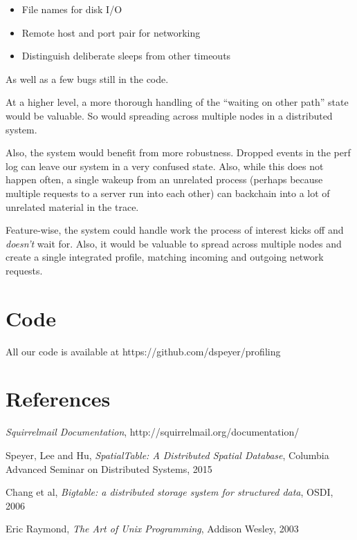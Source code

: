 \documentclass[10pt]{article}
\begin{document}
\begin{itemize}
\item File names for disk I/O
\item Remote host and port pair for networking
\item Distinguish deliberate sleeps from other timeouts
\end{itemize}

As well as a few bugs still in the code.

At a higher level, a more thorough handling of the ``waiting on other path'' state would be valuable.  So would spreading across multiple nodes in a distributed system.

Also, the system would benefit from more robustness.  Dropped events in the perf log can leave our system in a very confused state.  Also, while this does not happen often, a single wakeup from an unrelated process (perhaps because multiple requests to a server run into each other) can backchain into a lot of unrelated material in the trace.

Feature-wise, the system could handle work the process of interest kicks off and \emph{doesn't} wait for.  Also, it would be valuable to spread across multiple nodes and create a single integrated profile, matching incoming and outgoing network requests.

\section{Code}

All our code is available at https://github.com/dspeyer/profiling

\section{References}

\begin{thebibliography}{9}

  \emph{Squirrelmail Documentation},
  http://squirrelmail.org/documentation/

  Speyer, Lee and Hu,
  \emph{SpatialTable: A Distributed Spatial Database},
  Columbia Advanced Seminar on Distributed Systems,
  2015

  Chang et al,
  \emph{Bigtable: a distributed storage system for structured data},
  OSDI,
  2006

  Eric Raymond,
  \emph{The Art of Unix Programming},
  Addison Wesley,
  2003


\end{thebibliography}
\end{document}
